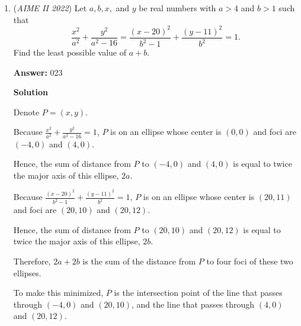 \begin{enumerate}
 The square of this is $\boxed{180}$. 

 



\textbf{Solution 7 (similar to 4)}

As in solution 4, let $X=AB\cap CD$, so $M$ is the incenter of $ADX$ and $XB=XC$. Let $XB=XC=x$. Then the normalized barycentric coordinates of $B$, $C$, and $M$ with respect to $ADX$ are $\left[\frac{x}{x+2}:0:\frac{2}{x+2}\right]$, $\left[0:\frac{x}{x+3}:\frac{3}{x+3}\right]$, and $\left[\frac{x+3}{2x+12}:\frac{x+2}{2x+12}:\frac{7}{2x+12}\right]$. So we have $\frac{1}{2}\frac{x}{x+2}=\frac{x+3}{2x+12}$ giving $x=6$. The sidelengths of $ADX$ are thus $AD=7$, $AX=8$, and $DX=9$ giving $[ADX]=12\sqrt 5$. Also, we have $[BCX]=\frac{6}{8}\cdot\frac{6}{9}[ADX]=6\sqrt 5$ so that $[ABCD]=[ADX]-[BCX]=6\sqrt 5$. The area squared is thus $\boxed{180}$.~~ golue3120

 


	\item (\textit{AIME II 2022}) Let $a, b, x,$ and $y$ be real numbers with $a>4$ and $b>1$ such that
 \[\frac{x^2}{a^2}+\frac{y^2}{a^2-16}=\frac{(x-20)^2}{b^2-1}+\frac{(y-11)^2}{b^2}=1.\]Find the least possible value of $a+b.$

 \textbf{Answer: }023



\textbf{Solution}

Denote $P = \left( x , y \right)$.

 Because $\frac{x^2}{a^2}+\frac{y^2}{a^2-16} = 1$, $P$  is on an ellipse whose center is $\left( 0 , 0 \right)$ and foci are $\left( - 4 , 0 \right)$ and $\left( 4 , 0 \right)$.

 Hence, the sum of distance from $P$ to $\left( - 4 , 0 \right)$ and $\left( 4 , 0 \right)$ is equal to twice the major axis of this ellipse, $2a$.

 Because $\frac{(x-20)^2}{b^2-1}+\frac{(y-11)^2}{b^2} = 1$, $P$  is on an ellipse whose center is $\left( 20 , 11 \right)$ and foci are $\left( 20 , 10 \right)$ and $\left( 20 , 12 \right)$.

 Hence, the sum of distance from $P$ to $\left( 20 , 10 \right)$ and $\left( 20 , 12 \right)$ is equal to twice the major axis of this ellipse, $2b$.

 Therefore, $2a + 2b$ is the sum of the distance from $P$ to four foci of these two ellipses.

 To make this minimized, $P$ is the intersection point of the line that passes through $\left( - 4 , 0 \right)$ and $\left( 20 , 10 \right)$, and the line that passes through $\left( 4 , 0 \right)$ and $\left( 20 , 12 \right)$.


\end{enumerate}
